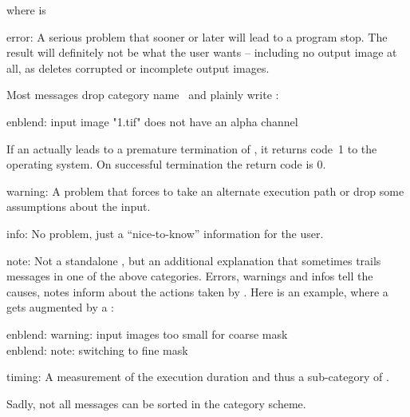 \noindent where  is

\begin{codelist}
\item[error:] A serious problem that sooner or later will lead to a program stop.  The result
  will definitely not be what the user wants -- including no output image at all, as \appcmd{}
  deletes corrupted or incomplete output images.

  Most messages drop category name~ and plainly write :

  \begin{literal}
    enblend: input image "1.tif" does not have an alpha channel
  \end{literal}

  If an  actually leads to a premature termination of \appcmd, it returns code~1
  to the operating system.  On successful termination the return code is 0.

\item[warning:] A problem that forces \appcmd{} to take an alternate execution path or drop some
  assumptions about the input.

\item[info:] No problem, just a ``nice-to-know'' information for the user.

\item[note:] Not a standalone , but an additional explanation that sometimes
  trails messages in one of the above categories.  Errors, warnings and infos tell the causes,
  notes inform about the actions taken by \appcmd{}.  Here is an example, where a 
  gets augmented by a :

  \begin{literal}
    enblend: warning: input images too small for coarse mask \\
    enblend: note: switching to fine mask
  \end{literal}

\item[timing:] A measurement of the execution duration and thus a sub\hyp{}category of
  .
\end{codelist}

\noindent Sadly, not all messages can be sorted in the category scheme.

